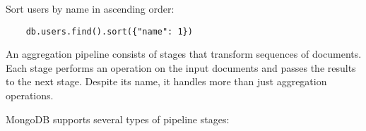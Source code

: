 \begin{example}[Sorting]
  Sort users by name in ascending order:
  \begin{lstlisting}
    db.users.find().sort({"name": 1})
  \end{lstlisting}
\end{example}


\begin{definition}
  An aggregation pipeline consists of stages that transform sequences of documents. Each stage performs an operation on the input documents and passes the results to the next stage. Despite its name, it handles more than just aggregation operations.
\end{definition}

MongoDB supports several types of pipeline stages:

